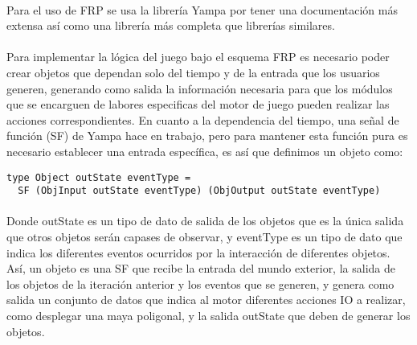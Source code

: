 \documentclass{standalone}
\begin{document}
\paragraph{}
Para el uso de FRP se usa la librería Yampa por tener una documentación más extensa así como una librería más completa que librerías similares.

\paragraph{}
Para implementar la lógica del juego bajo el esquema FRP es necesario poder crear objetos que dependan solo del tiempo y de la entrada que los usuarios generen, generando como salida la información necesaria para que los módulos que se encarguen de labores especificas del motor de juego pueden realizar las acciones correspondientes. En cuanto a la dependencia del tiempo, una señal de función (SF) de Yampa hace en trabajo, pero para mantener esta función pura es necesario establecer una entrada específica, es así que definimos un objeto como:

\begin{lstlisting}
type Object outState eventType =
  SF (ObjInput outState eventType) (ObjOutput outState eventType)
\end{lstlisting}

\paragraph{}
Donde outState es un tipo de dato de salida de los objetos que es la única salida que otros objetos serán capases de observar, y eventType es un tipo de dato que indica los diferentes eventos ocurridos por la interacción de diferentes objetos. Así, un objeto es una SF que recibe la entrada del mundo exterior, la salida de los objetos de la iteración anterior y los eventos que se generen, y genera como salida un conjunto de datos que indica al motor diferentes acciones IO a realizar, como desplegar una maya poligonal, y la salida outState que deben de generar los objetos.
\end{document}
